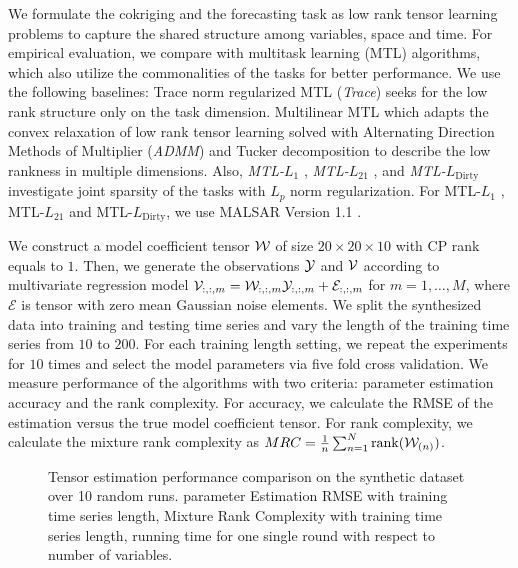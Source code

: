 We formulate the cokriging and the forecasting task as low rank tensor learning problems to capture the shared structure among variables, space and time. 
For empirical evaluation, we compare with  multitask learning (MTL) algorithms, which also utilize the commonalities of the tasks for better performance. We use the following baselines: Trace norm regularized MTL (\textit{Trace}) seeks for the low rank structure only on the task dimension.  Multilinear MTL \cite{romera2013multilinear} which adapts the convex relaxation of low rank tensor learning solved with Alternating Direction Methods of Multiplier  (\textit{ADMM}) \cite{gabay1976dual} and Tucker decomposition to describe the low rankness in multiple dimensions. Also, \textit{MTL-$L_1$} , \textit{MTL-$L_{21}$} \cite{nie2010efficient}, and\textit{ MTL-$L_{\mathrm{Dirty}}$}  \cite{jalali2010dirty} investigate joint sparsity of the tasks with $L_p$ norm regularization. For MTL-$L_1$ , MTL-$L_{21}$ \cite{nie2010efficient} and MTL-$L_{\mathrm{Dirty}}$, we use MALSAR Version 1.1 \cite{zhou2012mutal}. 


We construct a model coefficient tensor ${\mathcal W}$ of size $20 \times 20 \times 10 $ with CP rank equals to $1$.  Then, we generate the observations ${\mathcal Y}$ and ${\mathcal V}$ according to multivariate regression model ${\mathcal V}_{:,:,m} = {\mathcal W}_{:,:,m}{\mathcal Y}_{:, :, m} + \mathcal{E}_{:,:,m}$ for $m = 1, \ldots, M$, where $\mathcal{E}$ is tensor with zero mean Gaussian noise elements. We split the synthesized data into training and testing time series and vary the length of the training time series from $10$ to $200$. For each training length setting, we repeat the experiments for $10$ times and select the model parameters via five fold cross validation. We measure performance of the algorithms  with two criteria: parameter estimation accuracy and the rank complexity. For accuracy, we calculate the RMSE of the estimation versus the true model coefficient tensor. For rank complexity, we calculate the mixture rank complexity \cite{tomioka2010estimation} as $MRC = \frac{1}{n}\sum_{n=1}^{N}\mathrm{rank}({\mathcal W}_{(n)})$. 

\begin{figure*}[t]
\centering 
{}
\label{fig:synthetic}
\caption{Tensor estimation performance comparison on the synthetic dataset over 10 random runs.   parameter Estimation RMSE with training time series length,   Mixture Rank Complexity with training  time series length,   running time for one single round with respect to number of variables.}
\vskip -0.2in
\end{figure*} 


